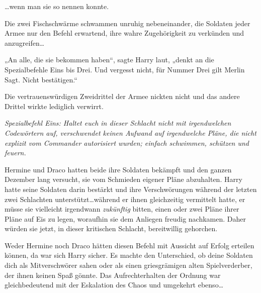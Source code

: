…wenn man sie so nennen konnte.

Die zwei Fischschwärme schwammen unruhig nebeneinander, die Soldaten jeder Armee nur den Befehl erwartend, ihre wahre Zugehörigkeit zu verkünden und anzugreifen…

„An alle, die sie bekommen haben“, sagte Harry laut, „denkt an die Spezialbefehle Eins bis Drei. Und vergesst nicht, für Nummer Drei gilt Merlin Sagt. Nicht bestätigen.“

Die vertrauenswürdigen Zweidrittel der Armee nickten nicht und das andere Drittel wirkte lediglich verwirrt.

\emph{Spezialbefehl Eins: Haltet euch in dieser Schlacht nicht mit irgendwelchen Codewörtern auf, verschwendet keinen Aufwand auf irgendwelche Pläne, die nicht explizit vom Commander autorisiert wurden; einfach schwimmen, schützen und feuern.}

Hermine und Draco hatten beide ihre Soldaten bekämpft und den ganzen Dezember lang versucht, sie vom Schmieden eigener Pläne abzuhalten. Harry hatte seine Soldaten darin bestärkt und ihre Verschwörungen während der letzten zwei Schlachten unterstützt…während er ihnen gleichzeitig vermittelt hatte, er müsse sie vielleicht irgendwann \emph{zukünftig} bitten, einen oder zwei Pläne ihrer Pläne auf Eis zu legen, woraufhin sie dem Anliegen freudig nachkamen. Daher würden sie jetzt, in dieser kritischen Schlacht, bereitwillig gehorchen.

Weder Hermine noch Draco hätten diesen Befehl mit Aussicht auf Erfolg erteilen können, da war sich Harry sicher. Es machte den Unterschied, ob deine Soldaten dich als Mitverschwörer sahen oder als einen griesgrämigen alten Spielverderber, der ihnen keinen Spaß gönnte. Das Aufrechterhalten der Ordnung war gleichbedeutend mit der Eskalation des Chaos und umgekehrt ebenso…

